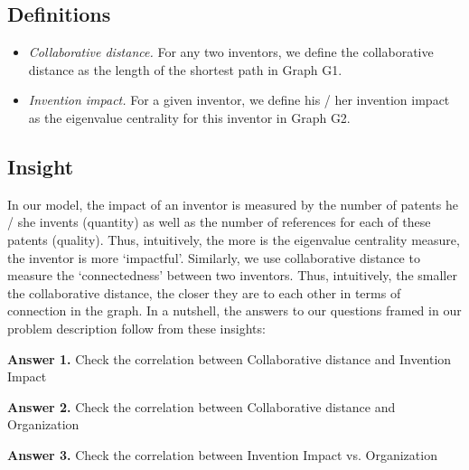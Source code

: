 \documentclass[11pt]{article}
\renewcommand{\paragraph}{\vspace{3pt}\noindent\textbf}
\begin{document}
\subsection{Definitions}
\begin{itemize}
\item {\em Collaborative distance.} For any two inventors, we define the collaborative distance as the length of the shortest path in Graph G1. 
\item {\em Invention impact.} For a given inventor, we define his / her invention impact as the eigenvalue centrality for this inventor in Graph G2. 
\end{itemize}

\subsection{Insight}
In our model, the impact of an inventor is measured by the number of patents he / she invents (quantity) as well as the number of references for each of these patents (quality). Thus, intuitively, the more is the eigenvalue centrality measure, the inventor is more ‘impactful’. Similarly, we use collaborative distance to measure the ‘connectedness’ between two inventors. Thus, intuitively, the smaller the collaborative distance, the closer they are to each other in terms of connection in the graph. 
In a nutshell, the answers to our questions framed in our problem description follow from these insights:

\paragraph{Answer 1.} Check the correlation between Collaborative distance and Invention Impact 

\paragraph{Answer 2.} Check the correlation between Collaborative distance and Organization

\paragraph{Answer 3.} Check the correlation between Invention Impact vs. Organization

		
\end{document}
